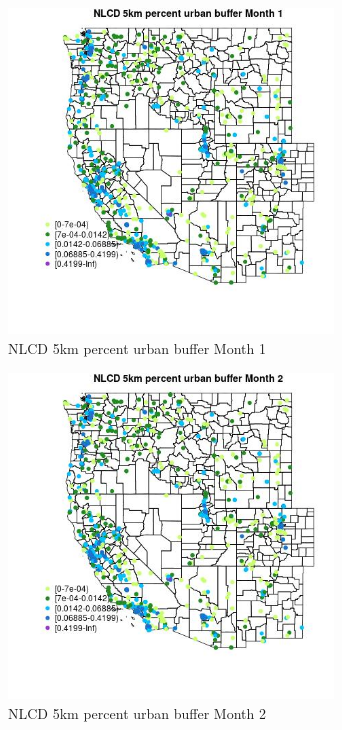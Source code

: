 \begin{figure} 
\centering  
\includegraphics[width=0.77\textwidth]{Code_Outputs/Report_ML_input_PM25_Step4_part_f_de_duplicated_aveswNAs_MapObsMo1NLCD_5km_percent_urban_buffer.jpg} 
\caption{\label{fig:Report_ML_input_PM25_Step4_part_f_de_duplicated_aveswNAsMapObsMo1NLCD_5km_percent_urban_buffer}NLCD 5km percent urban buffer Month 1} 
\end{figure} 
 

\clearpage 

\begin{figure} 
\centering  
\includegraphics[width=0.77\textwidth]{Code_Outputs/Report_ML_input_PM25_Step4_part_f_de_duplicated_aveswNAs_MapObsMo2NLCD_5km_percent_urban_buffer.jpg} 
\caption{\label{fig:Report_ML_input_PM25_Step4_part_f_de_duplicated_aveswNAsMapObsMo2NLCD_5km_percent_urban_buffer}NLCD 5km percent urban buffer Month 2} 
\end{figure} 
 


